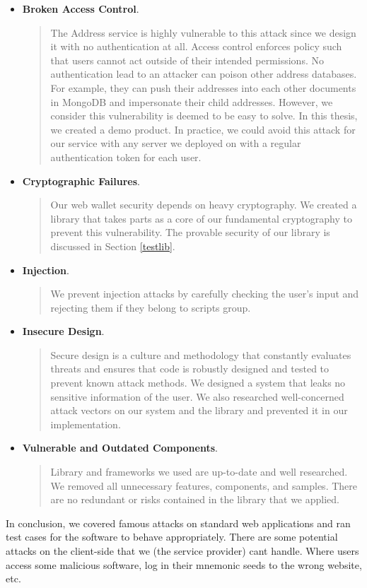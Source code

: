 \begin{itemize}
    \item \textbf{Broken Access Control}.
    \begin{quote}
        The Address service is highly vulnerable to this attack since we design it with no authentication at all. Access control enforces policy such that users cannot act outside of their intended permissions. No authentication lead to an attacker can poison other address databases. For example, they can push their addresses into each other documents in MongoDB and impersonate their child addresses. However, we consider this vulnerability is deemed to be easy to solve. In this thesis, we created a demo product. In practice, we could avoid this attack for our service with any server we deployed on with a regular authentication token for each user.
    \end{quote}
    \item \textbf{Cryptographic Failures}.
    \begin{quote}
        Our web wallet security depends on heavy cryptography. We created a library that takes parts as a core of our fundamental cryptography to prevent this vulnerability. The provable security of our library is discussed in Section \ref{testlib}.
    \end{quote}
    \item \textbf{Injection}.
    \begin{quote}
        We prevent injection attacks by carefully checking the user’s input and rejecting them if they belong to scripts group.
    \end{quote}
    \item \textbf{Insecure Design}.
    \begin{quote}
        Secure design is a culture and methodology that constantly evaluates threats and ensures that code is robustly designed and tested to prevent known attack methods. We designed a system that leaks no sensitive information of the user. We also researched well-concerned attack vectors on our system and the library and prevented it in our implementation.    \end{quote}
    \item \textbf{Vulnerable and Outdated Components}.
    \begin{quote}
        Library and frameworks we used are up-to-date and well researched. We removed all unnecessary features, components, and samples. There are no redundant or risks contained in the library that we applied.
    \end{quote}
\end{itemize}
In conclusion, we covered famous attacks on standard web applications and ran test cases for the software to behave appropriately. There are some potential attacks on the client-side that we (the service provider) cant handle. Where users access some malicious software, log in their mnemonic seeds to the wrong website, etc.

